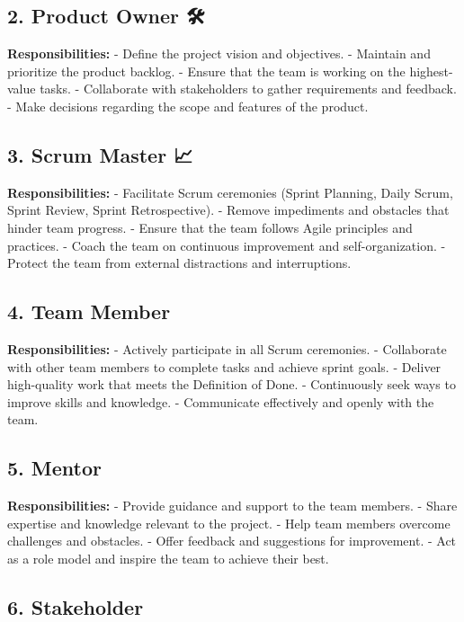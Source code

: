\documentclass[
  letterpaper,
  DIV=11,
  numbers=noendperiod]{scrreprt}
\begin{document}
\subsection{2. Product Owner 🛠️}\label{product-owner}

\textbf{Responsibilities:} - Define the project vision and objectives. -
Maintain and prioritize the product backlog. - Ensure that the team is
working on the highest-value tasks. - Collaborate with stakeholders to
gather requirements and feedback. - Make decisions regarding the scope
and features of the product.

\subsection{3. Scrum Master 📈}\label{scrum-master}

\textbf{Responsibilities:} - Facilitate Scrum ceremonies (Sprint
Planning, Daily Scrum, Sprint Review, Sprint Retrospective). - Remove
impediments and obstacles that hinder team progress. - Ensure that the
team follows Agile principles and practices. - Coach the team on
continuous improvement and self-organization. - Protect the team from
external distractions and interruptions.

\subsection{4. Team Member 👩‍💻👨‍💻}\label{team-member}

\textbf{Responsibilities:} - Actively participate in all Scrum
ceremonies. - Collaborate with other team members to complete tasks and
achieve sprint goals. - Deliver high-quality work that meets the
Definition of Done. - Continuously seek ways to improve skills and
knowledge. - Communicate effectively and openly with the team.

\subsection{5. Mentor 🧑‍🏫}\label{mentor}

\textbf{Responsibilities:} - Provide guidance and support to the team
members. - Share expertise and knowledge relevant to the project. - Help
team members overcome challenges and obstacles. - Offer feedback and
suggestions for improvement. - Act as a role model and inspire the team
to achieve their best.

\subsection{6. Stakeholder 👥}\label{stakeholder}
\end{document}
